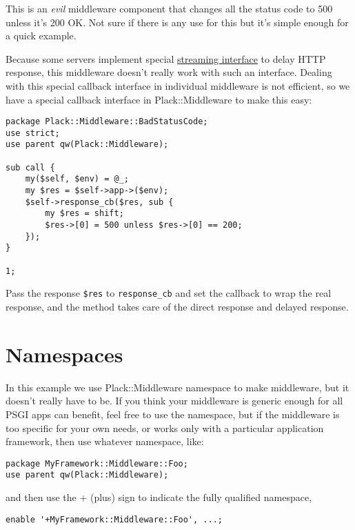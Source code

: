 This is an \emph{evil} middleware component that changes all the status
code to 500 unless it's 200 OK. Not sure if there is any use for this
but it's simple enough for a quick example.

Because some servers implement special
\href{http://bulknews.typepad.com/blog/2009/10/psgiplack-streaming-is-now-complete.html}{streaming
interface} to delay HTTP response, this middleware doesn't really work
with such an interface. Dealing with this special callback interface in
individual middleware is not efficient, so we have a special callback
interface in Plack::Middleware to make this easy:

\begin{lstlisting}
package Plack::Middleware::BadStatusCode;
use strict;
use parent qw(Plack::Middleware);

sub call {
    my($self, $env) = @_;
    my $res = $self->app->($env);
    $self->response_cb($res, sub {
        my $res = shift;
        $res->[0] = 500 unless $res->[0] == 200;
    });
}

1;
\end{lstlisting}

Pass the response \lstinline!$res! to \lstinline!response_cb! and set
the callback to wrap the real response, and the method takes care of the
direct response and delayed response.

\section{Namespaces}\label{namespaces}

In this example we use Plack::Middleware namespace to make middleware,
but it doesn't really have to be. If you think your middleware is
generic enough for all PSGI apps can benefit, feel free to use the
namespace, but if the middleware is too specific for your own needs, or
works only with a particular application framework, then use whatever
namespace, like:

\begin{lstlisting}
package MyFramework::Middleware::Foo;
use parent qw(Plack::Middleware);
\end{lstlisting}

and then use the + (plus) sign to indicate the fully qualified
namespace,

\begin{lstlisting}
enable '+MyFramework::Middleware::Foo', ...;
\end{lstlisting}

